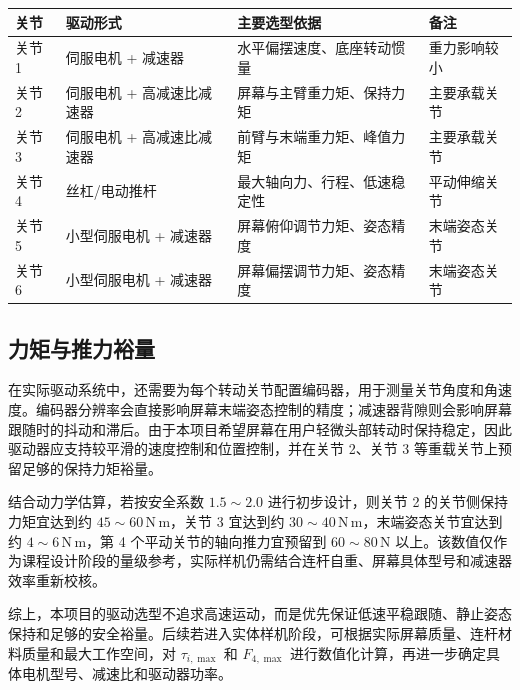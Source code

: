 \documentclass[12pt,a4paper,UTF8]{article}
\begin{document}
\begin{center}
    \centering
    \small
    \renewcommand{\arraystretch}{1.35}
    \begin{tabular}{|>{\centering\arraybackslash}p{}|>{\centering\arraybackslash}p{}|>{\centering\arraybackslash}p{}|>{\centering\arraybackslash}p{}|}
        \hline
        关节 & 驱动形式 & 主要选型依据 & 备注 \\
        \hline
        关节 1 & 伺服电机 + 减速器 & 水平偏摆速度、底座转动惯量 & 重力影响较小 \\
        \hline
        关节 2 & 伺服电机 + 高减速比减速器 & 屏幕与主臂重力矩、保持力矩 & 主要承载关节 \\
        \hline
        关节 3 & 伺服电机 + 高减速比减速器 & 前臂与末端重力矩、峰值力矩 & 主要承载关节 \\
        \hline
        关节 4 & 丝杠/电动推杆 & 最大轴向力、行程、低速稳定性 & 平动伸缩关节 \\
        \hline
        关节 5 & 小型伺服电机 + 减速器 & 屏幕俯仰调节力矩、姿态精度 & 末端姿态关节 \\
        \hline
        关节 6 & 小型伺服电机 + 减速器 & 屏幕偏摆调节力矩、姿态精度 & 末端姿态关节 \\
        \hline
    \end{tabular}
\end{center}

\subsection{力矩与推力裕量}

在实际驱动系统中，还需要为每个转动关节配置编码器，用于测量关节角度和角速度。编码器分辨率会直接影响屏幕末端姿态控制的精度；减速器背隙则会影响屏幕跟随时的抖动和滞后。由于本项目希望屏幕在用户轻微头部转动时保持稳定，因此驱动器应支持较平滑的速度控制和位置控制，并在关节 2、关节 3 等重载关节上预留足够的保持力矩裕量。

结合动力学估算，若按安全系数 $1.5\sim 2.0$ 进行初步设计，则关节 2 的关节侧保持力矩宜达到约 $45\sim 60\,\mathrm{N\,m}$，关节 3 宜达到约 $30\sim 40\,\mathrm{N\,m}$，末端姿态关节宜达到约 $4\sim 6\,\mathrm{N\,m}$，第 4 个平动关节的轴向推力宜预留到 $60\sim 80\,\mathrm{N}$ 以上。该数值仅作为课程设计阶段的量级参考，实际样机仍需结合连杆自重、屏幕具体型号和减速器效率重新校核。

综上，本项目的驱动选型不追求高速运动，而是优先保证低速平稳跟随、静止姿态保持和足够的安全裕量。后续若进入实体样机阶段，可根据实际屏幕质量、连杆材料质量和最大工作空间，对 $\tau_{i,\max}$ 和 $F_{4,\max}$ 进行数值化计算，再进一步确定具体电机型号、减速比和驱动器功率。
\end{document}
